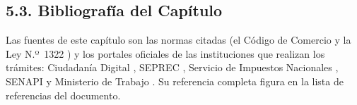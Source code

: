 \subsection{5.3. Bibliografía del Capítulo}

Las fuentes de este capítulo son las normas citadas (el Código de Comercio \parencite{codigocomercio1977} y la Ley N.º~1322 \parencite{ley1322}) y los portales oficiales de las instituciones que realizan los trámites: Ciudadanía Digital \parencite{ciudadaniadigital2026}, SEPREC \parencite{seprec2026}, Servicio de Impuestos Nacionales \parencite{sin2026}, SENAPI \parencite{senapi2026} y Ministerio de Trabajo \parencite{mintrabajo2026}. Su referencia completa figura en la lista de referencias del documento.
